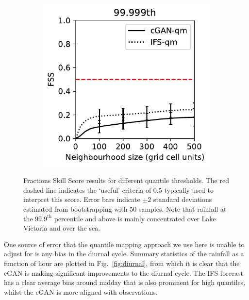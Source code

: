 \documentclass[../main.tex]{subfiles}
\begin{document}
\begin{figure}[t]
\begin{subfigure}[t]{0.32\textwidth}
     \caption{}
     \end{subfigure}
     \begin{subfigure}[t]{0.32\textwidth}
     \includegraphics[width=\textwidth]{images/fss_q99.999th_final-nologs_217600.pdf}
     \caption{}
     \end{subfigure}
     \caption{Fractions Skill Score results for different quantile thresholds. The red dashed line indicates the `useful' criteria of 0.5 typically used to interpret this score. Error bars indicate $\pm2$ standard deviations estimated from bootstrapping with 50 samples. Note that rainfall at the $99.9^{\text{th}}$ percentile and above is mainly concentrated over Lake Victoria and over the sea. }
     \label{fig:fss}
\end{figure}

One source of error that the quantile mapping approach we use here is unable to adjust for is any bias in the diurnal cycle. Summary statistics of the rainfall as a function of hour are plotted in Fig.~\ref{fig:diurnal}, from which it is clear that the cGAN is making significant improvements to the diurnal cycle. The IFS forecast has a clear average bias around midday that is also prominent for high quantiles, whilst the cGAN is more aligned with observations.
\end{document}

